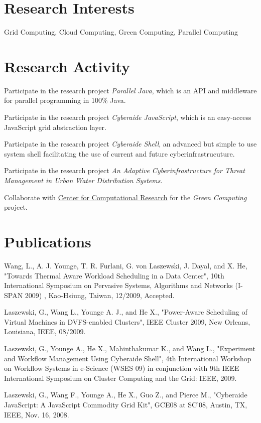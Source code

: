 \documentclass[10pt,letterpaper]{article}
\renewenvironment{itemize}{
  \begin{list}{}{
    \setlength{\leftmargin}{1.5em}
  }
}{
  \end{list}
}
\begin{document}
\section*{Research Interests}

Grid Computing, Cloud Computing, Green Computing, Parallel Computing

\section*{Research Activity}
\begin {itemize}
\item Participate in the research project {\em Parallel Java}, which is an API and middleware for parallel programming in 100\% Java.
\item Participate in the research project {\em Cyberaide JavaScript}, which is an easy-access JavaScript grid abstraction layer.
\item Participate in the research project {\em Cyberaide Shell}, an advanced but simple to use system shell facilitating the use of current and future cyberinfrastrucuture.
\item Participate in the research project {\em An Adaptive Cyberinfrastructure for 
Threat Management in Urban Water Distribution Systems}.
\item Collaborate with \href{http://www.ccr.buffalo.edu/display/WEB/Home} {Center for Computational Research} for the {\em Green Computing} project.
\end {itemize}


\section*{Publications}

\begin{itemize}
\item Wang, L., A. J. Younge, T. R. Furlani, G. von Laszewski, J. Dayal, and X. He, "Towards Thermal Aware Workload Scheduling in a Data Center", 10th International Symposium on Pervasive Systems, Algorithms and Networks (I-SPAN 2009) , Kao-Hsiung, Taiwan, 12/2009, Accepted.
\item Laszewski, G., Wang L., Younge A. J., and He X.,  "Power-Aware Scheduling of Virtual Machines in DVFS-enabled Clusters",  IEEE Cluster 2009, New Orleans, Louisiana, IEEE, 08/2009.
\item Laszewski, G., Younge A., He X., Mahinthakumar K., and Wang L.,  "Experiment and Workflow Management Using Cyberaide Shell",  4th International Workshop on Workflow Systems in e-Science (WSES 09) in conjunction with 9th IEEE International Symposium on Cluster Computing and the Grid: IEEE, 2009.
\item Laszewski, G., Wang F., Younge A., He X., Guo Z., and Pierce M.,  "Cyberaide JavaScript: A JavaScript Commodity Grid Kit",  GCE08 at SC'08, Austin, TX, IEEE, Nov. 16, 2008.
\end{itemize}
\end{document}
